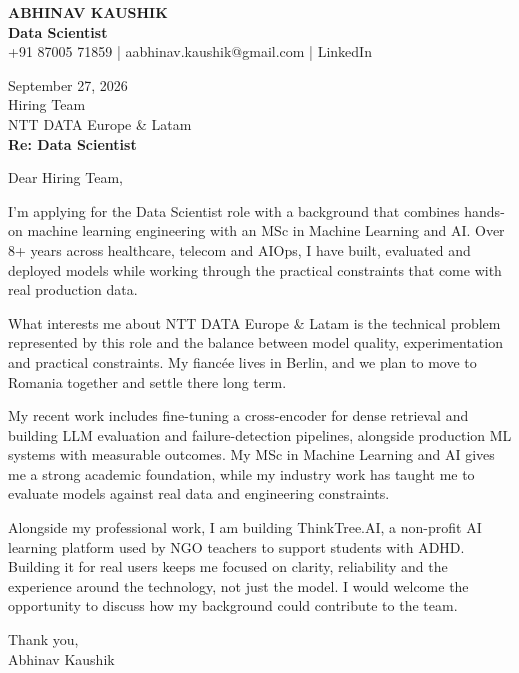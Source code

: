 \documentclass[10pt,a4paper]{article}
\begin{document}
\begin{center}
{\Large\bfseries ABHINAV KAUSHIK}\\[2pt]
{\bfseries Data Scientist}\\[2pt]
+91 87005 71859 \quad | \quad aabhinav.kaushik@gmail.com \quad | \quad LinkedIn
\end{center}
\vspace{8pt}
September 27, 2026\\[6pt]
Hiring Team\\
NTT DATA Europe \& Latam\\[4pt]
\textbf{Re: Data Scientist}

Dear Hiring Team,

I’m applying for the Data Scientist role with a background that combines hands-on machine learning engineering with an MSc in Machine Learning and AI. Over 8+ years across healthcare, telecom and AIOps, I have built, evaluated and deployed models while working through the practical constraints that come with real production data.

What interests me about NTT DATA Europe \& Latam is the technical problem represented by this role and the balance between model quality, experimentation and practical constraints. My fiancée lives in Berlin, and we plan to move to Romania together and settle there long term.

My recent work includes fine-tuning a cross-encoder for dense retrieval and building LLM evaluation and failure-detection pipelines, alongside production ML systems with measurable outcomes. My MSc in Machine Learning and AI gives me a strong academic foundation, while my industry work has taught me to evaluate models against real data and engineering constraints.

Alongside my professional work, I am building ThinkTree.AI, a non-profit AI learning platform used by NGO teachers to support students with ADHD. Building it for real users keeps me focused on clarity, reliability and the experience around the technology, not just the model. I would welcome the opportunity to discuss how my background could contribute to the team.

Thank you,\\
Abhinav Kaushik
\end{document}
